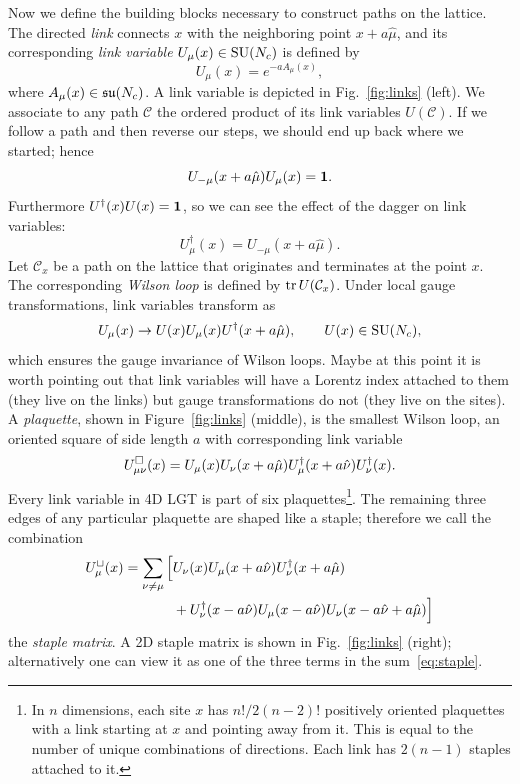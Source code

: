 Now we define the building blocks necessary to construct paths on the 
lattice. The directed {\it link} connects $x$ with the 
neighboring point $x+a\hat{\mu}$, and its corresponding {\it link variable} 
$U_\mu(x)\in \operatorname{SU}(N_c)$ is defined by
\begin{equation}
  U_\mu(x)=e^{-aA_{\mu}(x)},
\end{equation}
where $A_{\mu}(x)\in\operatorname{\mathfrak{su}}(N_c)$. A link variable is
depicted in Fig.~\ref{fig:links} (left).
We associate to any path $\mathcal{C}$ 
the ordered product of its link variables $U(\mathcal{C})$. 
If we follow a path and then reverse our steps, we should end
up back where we started; hence
\begin{equation}
  U_{-\mu}(x+a\hat{\mu})U_\mu(x)={\mathbf 1}.
\end{equation}
Furthermore $U^\dagger(x)U(x)={\mathbf 1}$, so we can see the effect
of the dagger on link variables:
\begin{equation}
  U_\mu^\dagger(x)=U_{-\mu}(x+a\hat{\mu}).
\end{equation}
Let $\mathcal{C}_{x}$ be a path on the lattice that originates and 
terminates at the point $x$. The corresponding {\it Wilson loop} is 
defined by $\tr U(\mathcal{C}_{x})$. 
Under local gauge transformations, link variables 
transform as
\begin{equation}
  U_\mu(x)\to U(x)U_\mu(x)U^{\dagger}(x+a\hat{\mu}),\qquad
  U(x)\in\operatorname{SU}(N_c),
\end{equation}
which ensures the gauge invariance of Wilson loops.
Maybe at this point it is worth pointing out that link variables will
have a Lorentz index attached to them (they live on the links) but
gauge transformations do not (they live on the sites). A 
{\it plaquette}, shown in Figure~\ref{fig:links} (middle), is the 
smallest Wilson loop, an oriented square of side length $a$ with 
corresponding link variable 
\begin{equation}
  U^\square_{\mu\nu}(x)=U_\mu(x)U_\nu(x+a\hat{\mu})
                        U^\dagger_\mu(x+a\hat{\nu})U^\dagger_\nu(x).
\end{equation}
Every link variable in 4D LGT is part of six plaquettes\footnote{In $n$
dimensions, each site $x$ has $n!/2(n-2)!$ positively oriented plaquettes 
with a link starting at $x$ and pointing away from it. This is equal to the
number of unique combinations of directions. Each link has $2(n-1)$ staples
attached to it.}. The remaining
three edges of any particular plaquette are shaped like
a staple; therefore we call the combination
\begin{equation}\begin{aligned}\label{eq:staple}\index{staple}
  U^\sqcup_\mu(x)=
  \sum_{\nu\ne\mu}\Big[
   &U_\nu(x)U_\mu(x+a\hat{\nu})U^\dagger_\nu(x+a\hat{\mu})\\
   &+U^\dagger_\nu(x-a\hat{\nu})U_\mu(x-a\hat{\nu})
                   U_\nu(x-a\hat{\nu}+a\hat{\mu})\Big]
\end{aligned}\end{equation}
the {\it staple matrix}. A 2D staple matrix is shown in
Fig.~\ref{fig:links} (right); alternatively one can view it
as one of the three terms in the sum~\eqref{eq:staple}.

